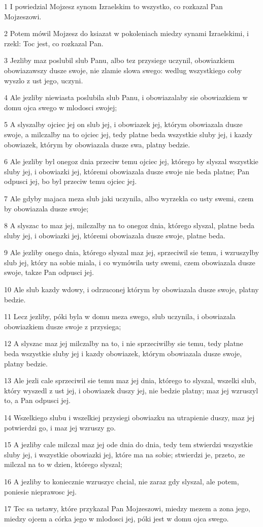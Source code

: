 \par 1 I powiedzial Mojzesz synom Izraelskim to wszystko, co rozkazal Pan Mojzeszowi.
\par 2 Potem mówil Mojzesz do ksiazat w pokoleniach miedzy synami Izraelskimi, i rzekl: Toc jest, co rozkazal Pan.
\par 3 Jezliby maz poslubil slub Panu, albo tez przysiege uczynil, obowiazkiem obowiazawszy dusze swoje, nie zlamie slowa swego: wedlug wszystkiego coby wyszlo z ust jego, uczyni.
\par 4 Ale jezliby niewiasta poslubila slub Panu, i obowiazalaby sie obowiazkiem w domu ojca swego w mlodosci swojej;
\par 5 A slyszalby ojciec jej on slub jej, i obowiazek jej, którym obowiazala dusze swoje, a milczalby na to ojciec jej, tedy platne beda wszystkie sluby jej, i kazdy obowiazek, którym by obowiazala dusze swa, platny bedzie.
\par 6 Ale jezliby byl onegoz dnia przeciw temu ojciec jej, którego by slyszal wszystkie sluby jej, i obowiazki jej, któremi obowiazala dusze swoje nie beda platne; Pan odpusci jej, bo byl przeciw temu ojciec jej.
\par 7 Ale gdyby majaca meza slub jaki uczynila, albo wyrzekla co usty swemi, czem by obowiazala dusze swoje;
\par 8 A slyszac to maz jej, milczalby na to onegoz dnia, którego slyszal, platne beda sluby jej, i obowiazki jej, któremi obowiazala dusze swoje, platne beda.
\par 9 Ale jezliby onego dnia, którego slyszal maz jej, sprzeciwil sie temu, i wzruszylby slub jej, który na sobie miala, i co wymówila usty swemi, czem obowiazala dusze swoje, takze Pan odpusci jej.
\par 10 Ale slub kazdy wdowy, i odrzuconej którym by obowiazala dusze swoje, platny bedzie.
\par 11 Lecz jezliby, póki byla w domu meza swego, slub uczynila, i obowiazala obowiazkiem dusze swoje z przysiega;
\par 12 A slyszac maz jej milczalby na to, i nie sprzeciwilby sie temu, tedy platne beda wszystkie sluby jej i kazdy obowiazek, którym obowiazala dusze swoje, platny bedzie.
\par 13 Ale jezli cale sprzeciwil sie temu maz jej dnia, którego to slyszal, wszelki slub, który wyszedl z ust jej, i obowiazek duszy jej, nie bedzie platny; maz jej wzruszyl to, a Pan odpusci jej.
\par 14 Wszelkiego slubu i wszelkiej przysiegi obowiazku na utrapienie duszy, maz jej potwierdzi go, i maz jej wzruszy go.
\par 15 A jezliby cale milczal maz jej ode dnia do dnia, tedy tem stwierdzi wszystkie sluby jej, i wszystkie obowiazki jej, które ma na sobie; stwierdzi je, przeto, ze milczal na to w dzien, którego slyszal;
\par 16 A jezliby to koniecznie wzruszyc chcial, nie zaraz gdy slyszal, ale potem, poniesie nieprawosc jej.
\par 17 Tec sa ustawy, które przykazal Pan Mojzeszowi, miedzy mezem a zona jego, miedzy ojcem a córka jego w mlodosci jej, póki jest w domu ojca swego.

